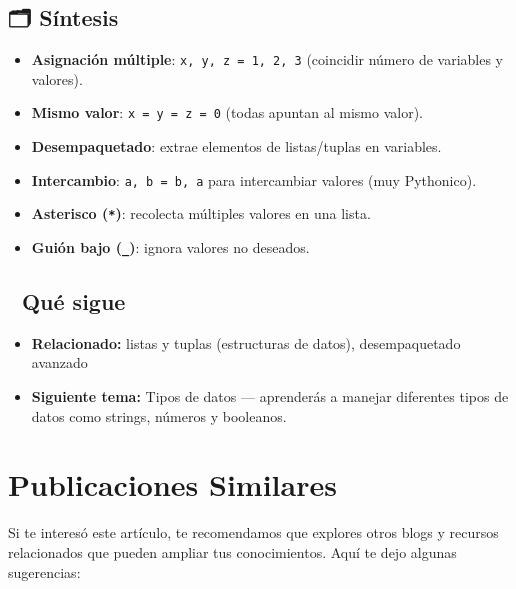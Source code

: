 \documentclass[
  doc,
  floatsintext,
  longtable,
  a4paper,
  nolmodern,
  notxfonts,
  notimes,
  12pt,
  colorlinks=true,linkcolor=blue,citecolor=blue,urlcolor=blue]{apa7}
\providecommand{\tightlist}{%
  \setlength{\itemsep}{0pt}\setlength{\parskip}{0pt}}
\begin{document}
\subsection{🗂️ Síntesis}\label{suxedntesis}

\begin{itemize}
\tightlist
\item
  \textbf{Asignación múltiple}: \texttt{x,\ y,\ z\ =\ 1,\ 2,\ 3}
  (coincidir número de variables y valores).
\item
  \textbf{Mismo valor}: \texttt{x\ =\ y\ =\ z\ =\ 0} (todas apuntan al
  mismo valor).
\item
  \textbf{Desempaquetado}: extrae elementos de listas/tuplas en
  variables.
\item
  \textbf{Intercambio}: \texttt{a,\ b\ =\ b,\ a} para intercambiar
  valores (muy Pythonico).
\item
  \textbf{Asterisco (\texttt{*})}: recolecta múltiples valores en una
  lista.
\item
  \textbf{Guión bajo (\texttt{\_})}: ignora valores no deseados.
\end{itemize}

\subsection{🔗 Qué sigue}\label{quuxe9-sigue}

\begin{itemize}
\tightlist
\item
  \textbf{Relacionado:} listas y tuplas (estructuras de datos),
  desempaquetado avanzado
\item
  \textbf{Siguiente tema:} Tipos de datos --- aprenderás a manejar
  diferentes tipos de datos como strings, números y booleanos.
\end{itemize}

\section{Publicaciones Similares}\label{publicaciones-similares}

Si te interesó este artículo, te recomendamos que explores otros blogs y
recursos relacionados que pueden ampliar tus conocimientos. Aquí te dejo
algunas sugerencias:
\end{document}
